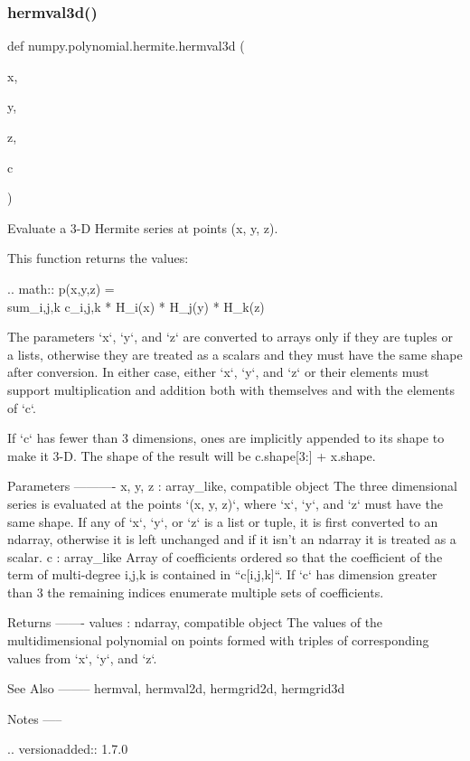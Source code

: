 \subsubsection{\texorpdfstring{hermval3d()}{hermval3d()}}
{\footnotesize\ttfamily def numpy.\+polynomial.\+hermite.\+hermval3d (\begin{DoxyParamCaption}\item[{}]{x,  }\item[{}]{y,  }\item[{}]{z,  }\item[{}]{c }\end{DoxyParamCaption})}

\begin{DoxyVerb}Evaluate a 3-D Hermite series at points (x, y, z).

This function returns the values:

.. math:: p(x,y,z) = \\sum_{i,j,k} c_{i,j,k} * H_i(x) * H_j(y) * H_k(z)

The parameters `x`, `y`, and `z` are converted to arrays only if
they are tuples or a lists, otherwise they are treated as a scalars and
they must have the same shape after conversion. In either case, either
`x`, `y`, and `z` or their elements must support multiplication and
addition both with themselves and with the elements of `c`.

If `c` has fewer than 3 dimensions, ones are implicitly appended to its
shape to make it 3-D. The shape of the result will be c.shape[3:] +
x.shape.

Parameters
----------
x, y, z : array_like, compatible object
    The three dimensional series is evaluated at the points
    `(x, y, z)`, where `x`, `y`, and `z` must have the same shape.  If
    any of `x`, `y`, or `z` is a list or tuple, it is first converted
    to an ndarray, otherwise it is left unchanged and if it isn't an
    ndarray it is  treated as a scalar.
c : array_like
    Array of coefficients ordered so that the coefficient of the term of
    multi-degree i,j,k is contained in ``c[i,j,k]``. If `c` has dimension
    greater than 3 the remaining indices enumerate multiple sets of
    coefficients.

Returns
-------
values : ndarray, compatible object
    The values of the multidimensional polynomial on points formed with
    triples of corresponding values from `x`, `y`, and `z`.

See Also
--------
hermval, hermval2d, hermgrid2d, hermgrid3d

Notes
-----

.. versionadded:: 1.7.0\end{DoxyVerb}
 \mbox{\label{namespacenumpy_1_1polynomial_1_1hermite_a14796e0a003d1d2ca15b7bb86fc72d9d}} 
